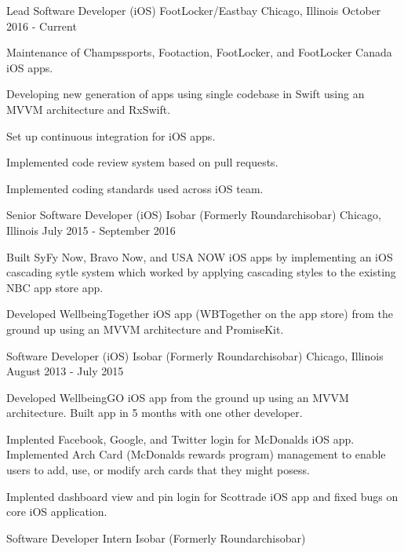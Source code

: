 \begin{cventries}
  \cventry
    {Lead Software Developer (iOS)}
    {FootLocker/Eastbay}
    {Chicago, Illinois}
    {October 2016 - Current}
    {
      \begin{cvitems}
        \item {Maintenance of Champssports, Footaction, FootLocker, and FootLocker Canada iOS apps. }
        \item {Developing new generation of apps using single codebase in Swift using an MVVM architecture and RxSwift.}
        \item {Set up continuous integration for iOS apps. }
        \item {Implemented code review system based on pull requests. }
        \item {Implemented coding standards used across iOS team. }
      \end{cvitems}
    }
  \cventry
    {Senior Software Developer (iOS)}
    {Isobar (Formerly Roundarchisobar)}
    {Chicago, Illinois}
    {July 2015 - September 2016}
    {
      \begin{cvitems}
        \item {Built SyFy Now, Bravo Now, and USA NOW iOS apps by implementing an iOS cascading sytle system which worked by applying cascading styles to the existing NBC app store app. }
        \item {Developed WellbeingTogether iOS app (WBTogether on the app store) from the ground up using an MVVM architecture and PromiseKit.}
      \end{cvitems}
    }
  \cventry
    {Software Developer (iOS)}
    {Isobar (Formerly Roundarchisobar)}
    {Chicago, Illinois}
    {August 2013 - July 2015}
    {
      \begin{cvitems}
        \item {Developed WellbeingGO iOS app from the ground up using an MVVM architecture. Built app in 5 months with one other developer.}
        \item {Implented Facebook, Google, and Twitter login for McDonalds iOS app. Implemented Arch Card (McDonalds rewards program) 
        management to enable users to add, use, or modify arch cards that they might posess.}
        \item {Implented dashboard view and pin login for Scottrade iOS app and fixed bugs on core iOS application.}
      \end{cvitems}
    }
  \cventry
    {Software Developer Intern}
    {Isobar (Formerly Roundarchisobar)}

\end{cventries}
